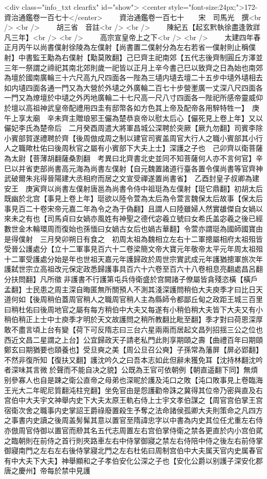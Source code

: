 <div class="info_txt clearfix" id="show">
<center style="font-size:24px;">172-資治通鑑卷一百七十</center>
  　　資治通鑑卷一百七十　　宋　司馬光　撰<br />
<br />
　　胡三省　音註<br />
<br />
　　陳紀五【起玄黓執徐盡逢敦牂凡三年】<br />
<br />
　　高宗宣皇帝上之下<br />
<br />
　　太建四年春正月丙午以尚書僕射徐陵為左僕射【尚書置二僕射分為左右若省一僕射則止稱僕射】中書監王勱為右僕射【勱莫敗翻】己巳齊主祀南郊【五代志後齊制圓丘方澤並三年一祭謂之禘祀其南北郊則歲一祀皆以正月上辛今書己巳以致齊之日為始也南郊為壇於國南廣輪三十六尺高九尺四面各一陛為三壝内壝去壇二十五步中壝外壝相去如内壝四面各通一門又為大營於外壝之外廣輪二百七十步營壍廣一丈深八尺四面各一門又為燎壇於中壝之外丙地廣輪二十七尺高一尺八寸四面各一陛祀所感帝靈威仰於壇以高祖神武皇帝配禮用四圭有邸幣各如方色其上帝及配帝各用騂特牲一】　庚午上享太廟　辛未齊主贈琅邪王儼為楚恭哀帝以慰太后心【儼死見上卷上年】又以儼妃李氏為楚帝后　二月癸酉周遣大將軍昌城公深聘於突厥【厥九勿翻】司賓李除小賓部賀遂禮聘於齊【後周倣成周之制以建官司賓盖周官大行人之職小賓部其小行人之職歟杜佑曰後周秋官之屬有小賓部下大夫上士】深護之子也　己卯齊以衛菩薩為太尉【菩薄胡翻薩桑割翻　考異曰北齊書北史並同不知菩薩何人亦不言何官】辛巳以并省吏部尚書高元海為尚書左僕射【自元魏置諸道行臺各置令僕尚書等官齊神武破爾朱兆得晉陽建大丞相府而居之文宣受禪遂置尚書省】　乙酉封皇子叔卿為建安王　庚寅齊以尚書左僕射唐邕為尚書令侍中祖珽為左僕射【珽它鼎翻】初胡太后既幽於北宫【事見上卷上年】珽欲以陸令萱為太后為令萱言魏保太后故事【保太后事見百二十卷宋帝元嘉二年為令之為于偽翻】且謂人曰陸雖婦人然實䧺傑自女媧以來未之有也【司馬貞曰女媧亦風姓有神聖之德代宓羲立號曰女希氏盖宓羲之後已經數世金木輪環周而復始也孫愐曰女媧古女后也媧古華翻】令萱亦謂珽為國師國寶由是得僕射　三月癸卯朔日有食之　初周太祖為魏相立左右十二軍摠屬相府太祖殂皆受晉公護處分【立十二軍事見百六十二卷梁簡文帝大寶元年敬帝太平元年周太祖殂十二軍受護處分始是年也世祖天嘉元年護歸政於周世宗實武成元年護猶摠軍旅次年護弑世宗立高祖改元保定政悉歸護事具百六十六卷至百六十八卷相息亮翻處昌呂翻分扶問翻】凡所徵非護書不行護第屯兵侍衛盛於宫闕諸子僚屬皆貪殘恣橫【橫戶孟翻】士民患之周主深自晦匿無所關預人不測其淺深護問稍伯大夫庾季才曰比日天道何如【後周稍伯蓋周官稍人之職周官稍人主為縣師令都鄙丘甸之政距王城三百里曰稍杜佑曰後周地官之屬有每方稍伯中大夫又每遂有小稍伯稍大夫皆下大夫又有小稍伯稍正上士中士庾季才明於天文故護問之稍所教翻比毗至翻】季才對曰荷恩深厚敢不盡言頃上台有變【荷下可反隋志曰三台六星兩兩而居起文昌列招揺三公之位也西近文昌二星謂之上台】公宜歸政天子請老私門此則享期頤之壽【曲禮百年曰期頤鄭玄曰期猶要也頤養也】受旦奭之美【周公旦召公奭】子孫常為藩屏【屏必郢翻】不然非復所知【復扶又翻】護沈吟久之曰吾本志如此但辭未獲免耳【沈持林翻沈吟者深味其言微於聲而不能自决之貌】公既為王官可依朝例【朝直遥翻下同】無煩别參寡人也自是踈之衛公直帝之母弟也深昵於護及沌口之敗【沌口敗事見上卷臨海王光大二年昵尼質翻沌柱兖翻】坐免官由是怨護勸帝誅之冀得其位帝乃密與直及右宫伯中大夫宇文神舉内史下大夫太原王軌右侍上士宇文孝伯謀之【周官宫伯掌王宫宿衛次舍之職事内史掌詔王爵祿廢置殺生予奪之法命諸侯孤卿大夫則策命之凡四方之事書内史讀之後周盖髣髴其意以置官至隋諱忠字以中書為内史其位任尤重左右侍亦倣周官侍御以置官而剙其名五代志周置左右宫伯掌侍衛之禁各更直於内小宫伯貮之臨朝則在前侍之首行則夾路車左右中侍掌御寢之禁左右侍陪中侍之後左右前侍掌御寢南門之左右左右後侍掌寢北門之左右杜佑曰周制宫伯中大夫属天官内史属春官有中大夫下大夫】神舉顯和之子孝伯安化公深之子也【安化公爵以别護子深安化郡唐之慶州】帝每於禁中見護